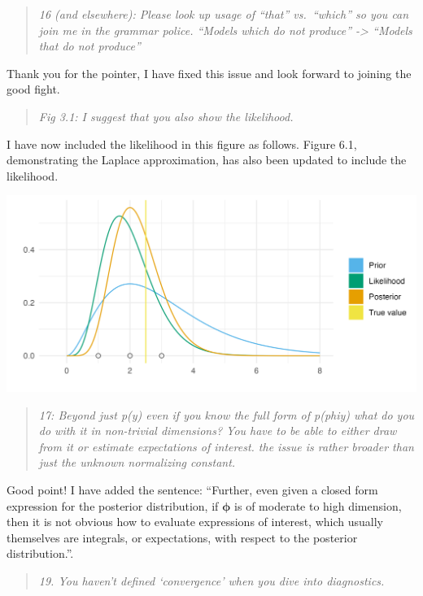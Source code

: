 \documentclass[
  12pt,
]{article}
\begin{document}
\begin{quote}
\emph{16 (and elsewhere): Please look up usage of ``that'' vs.~``which''
so you can join me in the grammar police. ``Models which do not
produce'' -\textgreater{} ``Models that do not produce''}
\end{quote}

Thank you for the pointer, I have fixed this issue and look forward to
joining the good fight.

\begin{quote}
\emph{Fig 3.1: I suggest that you also show the likelihood.}
\end{quote}

I have now included the likelihood in this figure as follows. Figure
6.1, demonstrating the Laplace approximation, has also been updated to
include the likelihood.

\begin{center}\includegraphics[width=0.95\linewidth]{../figures/bayesian/conjugate} \end{center}

\begin{quote}
\emph{17: Beyond just p(y) even if you know the full form of
p(phi\textbar y) what do you do with it in non-trivial dimensions? You
have to be able to either draw from it or estimate expectations of
interest. the issue is rather broader than just the unknown normalizing
constant.}
\end{quote}

Good point! I have added the sentence: ``Further, even given a closed
form expression for the posterior distribution, if
\(\boldsymbol{\mathbf{\phi}}\) is of moderate to high dimension, then it
is not obvious how to evaluate expressions of interest, which usually
themselves are integrals, or expectations, with respect to the posterior
distribution.''.

\begin{quote}
\emph{19. You haven't defined `convergence' when you dive into
diagnostics.}
\end{quote}
\end{document}
